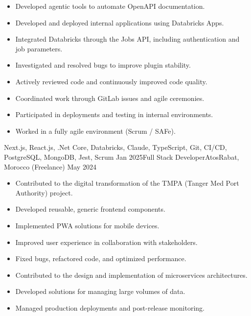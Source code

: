 \begin{experiences}
{\begin{itemize}
                \item Developed agentic tools to automate OpenAPI documentation.
                \item Developed and deployed internal applications using Databricks Apps.
                \item Integrated Databricks through the Jobs API, including authentication and job parameters.
                \item Investigated and resolved bugs to improve plugin stability.
                \item Actively reviewed code and continuously improved code quality.
                \item Coordinated work through GitLab issues and agile ceremonies.
                \item Participated in deployments and testing in internal environments.
                \item Worked in a fully agile environment (Scrum / SAFe).\\
            \end{itemize}}
            {Next.js, React.js, .Net Core, Databricks, Claude, TypeScript, Git, CI/CD, PostgreSQL, MongoDB, Jest, Scrum}
    \emptySeparator
     \experience
        {Jan 2025}{Full Stack Developer}{Atos}{Rabat, Morocco (Freelance)}
        {May 2024}
            {\begin{itemize}
                \item Contributed to the digital transformation of the TMPA (Tanger Med Port Authority) project.
                \item Developed reusable, generic frontend components.
                \item Implemented PWA solutions for mobile devices.
                \item Improved user experience in collaboration with stakeholders.
                \item Fixed bugs, refactored code, and optimized performance.
                \item Contributed to the design and implementation of microservices architectures.
                \item Developed solutions for managing large volumes of data.
                \item Managed production deployments and post-release monitoring.

\end{itemize}}
\end{experiences}

